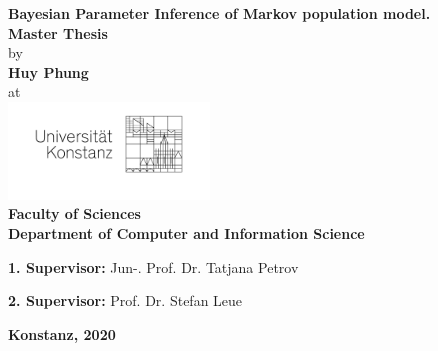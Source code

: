 \begin{titlepage}
  \begin{center}
    {\LARGE \textbf{Bayesian Parameter Inference of Markov population model.}}
    \\[1cm]
    {\Large \textbf{Master Thesis}}
    \\[1cm]
    {\Large by}
    \\[0.5cm]
    {\LARGE \textbf{Huy Phung}}
    \\[0.5cm]
    {\Large at}
    \\[0.5cm]
    \includegraphics[width=0.4\textwidth]{figures/unisignet-klein.jpg}
    \\[1cm]
    {\Large \textbf{Faculty of Sciences}}
    \\[1cm]
    {\Large \textbf{Department of Computer and Information Science}}
    \\[2cm]
    \begin{minipage}[c]{0.8\textwidth}
      \begin{description}[style=multiline]
      \item { \Large \textbf{1. Supervisor:} Jun-. Prof. Dr. Tatjana Petrov }
      \item { \Large \textbf{2. Supervisor:} Prof. Dr. Stefan Leue }
      \end{description}
    \end{minipage}
    \vfill
    {\LARGE \textbf{Konstanz, 2020}}
  \end{center}
\end{titlepage}